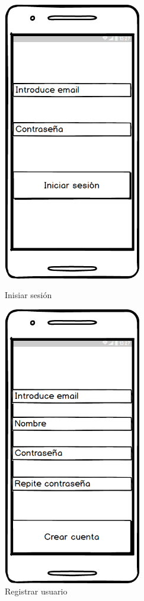 	
	\begin{figure}[htbp]
\begin{minipage}[b]{0.5\linewidth} %
\centering
\includegraphics[width=6cm]{maqueta/Iniciar.png}
 
\caption{Inisiar sesión}
\label{fig:iniciar}
\end{minipage}
\hspace{0.5cm} %
\begin{minipage}[b]{0.5\linewidth}
\centering
\includegraphics[width=6cm]{maqueta/Registrarse.png}
 
\caption{Registrar usuario}
\label{fig:regis}
\end{minipage}

\end{figure}

